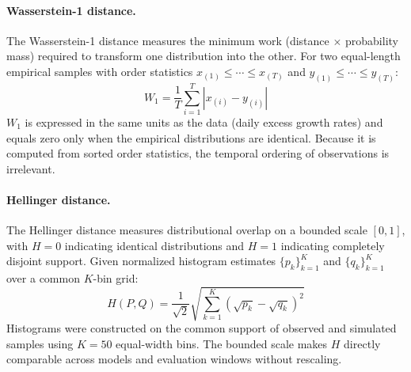 \paragraph{Wasserstein-1 distance.}
The Wasserstein-1 distance measures the minimum work (distance $\times$ probability mass) required to transform one distribution into the other. For two equal-length empirical samples with order statistics $x_{(1)} \le \cdots \le x_{(T)}$ and $y_{(1)} \le \cdots \le y_{(T)}$:
\begin{equation}
    W_1 = \frac{1}{T}\sum_{i=1}^{T} \left\lvert x_{(i)} - y_{(i)} \right\rvert
    \label{eq:wasserstein}
\end{equation}
$W_1$ is expressed in the same units as the data (daily excess growth rates) and equals zero only when the empirical distributions are identical. Because it is computed from sorted order statistics, the temporal ordering of observations is irrelevant.

\paragraph{Hellinger distance.}
The Hellinger distance measures distributional overlap on a bounded scale $[0, 1]$, with $H = 0$ indicating identical distributions and $H = 1$ indicating completely disjoint support. Given normalized histogram estimates $\{p_k\}_{k=1}^{K}$ and $\{q_k\}_{k=1}^{K}$ over a common $K$-bin grid:
\begin{equation}
    H(P, Q) = \frac{1}{\sqrt{2}}\sqrt{\sum_{k=1}^{K}\left(\sqrt{p_k} - \sqrt{q_k}\right)^2}
    \label{eq:hellinger}
\end{equation}
Histograms were constructed on the common support of observed and simulated samples using $K = 50$ equal-width bins. The bounded scale makes $H$ directly comparable across models and evaluation windows without rescaling.

